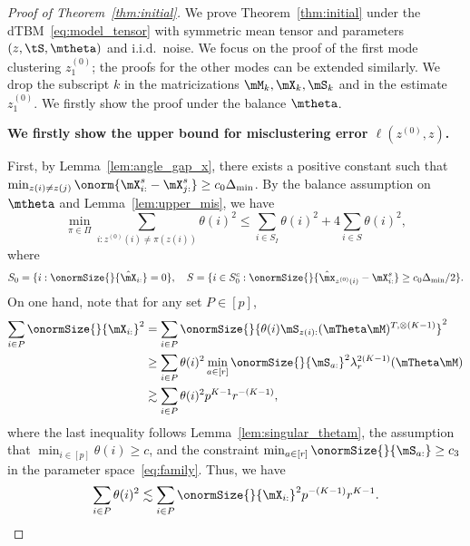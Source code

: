 \documentclass[lettersize,onecolumn,journal]{IEEEtran}
\theoremstyle{definition}
\theoremstyle{definition}
\begin{document}
\begin{proof}[Proof of Theorem~\ref{thm:initial}] We prove Theorem~\ref{thm:initial} under the dTBM~\eqref{eq:model_tensor} with symmetric mean tensor and parameters $(z, \tS, \mtheta)$ and i.i.d.\ noise. We focus on the proof of the first mode clustering $z^{(0)}_1$; the proofs for the other modes can be extended similarly. We drop the subscript $k$ in the matricizations $\mM_k, \mX_k, \mS_k$ and in the estimate $z^{(0)}_1$. We firstly show the proof under the balance $\mtheta$.

\textbf{We firstly show the upper bound for misclustering error $\ell(z^{(0)}, z)$.}

First, by Lemma~\ref{lem:angle_gap_x}, there exists a positive constant such that $\min_{z(i) \neq z(j)} \onorm{ \mX^s_{i:} - \mX^s_{j:} } \geq c_0  \Delta_{\min}$. By the balance assumption on $\mtheta$ and Lemma~\ref{lem:upper_mis}, we have 
 \begin{equation}\label{eq:theta_bound}
          \min_{\pi \in \Pi} \sum_{i : z^{(0)}(i) \neq \pi(z(i))} \theta(i)^2  \leq  \sum_{i \in S_I} \theta(i)^2 + 4 \sum_{i \in S} \theta(i)^2 ,
    \end{equation}
    where 
    \begin{equation}
        S_0 = \{i: \onormSize{}{\hat \mX_{i:}} = 0\}, \quad S = \{i \in S_0^c: \onormSize{}{\hat \mx_{z^{(0)}(i)} - \mX_{i:}^s } \geq c_0  \Delta_{\min}/2\}.
    \end{equation}
    On one hand, note that for any set $P \in [p]$,
    \begin{align}
        \sum_{i \in P} \onormSize{}{\mX_{i:}}^2 &= \sum_{i \in P} \onormSize{}{ \theta(i) \mS_{z(i):} (\mTheta \mM)^{T, \otimes (K-1)} }^2 \\
        & \geq \sum_{i \in P} \theta(i)^2 \min_{a \in [r]} \onormSize{}{\mS_{a:}}^2 \lambda_{r}^{2(K-1)} (\mTheta \mM)\\
        & \gtrsim \sum_{i \in P} \theta(i)^2 p^{K-1} r^{-(K-1)}, 
    \end{align}
    where the last inequality follows Lemma~\ref{lem:singular_thetam}, the assumption that $\min_{i \in [p]} \theta(i) \geq c$, and the constraint $\min_{a \in [r]} \onormSize{}{\mS_{a:}} \geq c_3$ in the parameter space~\eqref{eq:family}. Thus, we have 
    \begin{equation}\label{eq:theta_p}
        \sum_{i \in P} \theta(i)^2 \lesssim \sum_{i \in P} \onormSize{}{\mX_{i:}}^2 p^{-(K-1)} r^{K-1}.
    \end{equation}
    

\end{proof}
\end{document}
